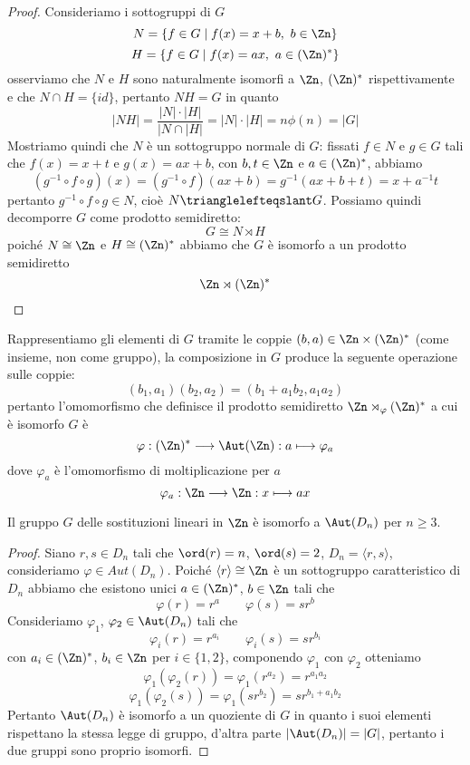 \documentclass[11pt]{scrartcl}
\begin{document}
\begin{proof}
    Consideriamo i sottogruppi di $G$
    \[
        N = \{f \in G\mid f(x) = x + b,~b \in \Zn\}
    \]
    \[
        H = \{f \in G\mid f(x) = ax,~a \in (\Zn)^*\}
    \]
    osserviamo che $N$ e $H$ sono naturalmente isomorfi a $\Zn$, $(\Zn)^*$ 
    rispettivamente e che $N \cap H = \{id\}$, pertanto $NH = G$ in quanto 
    \[
        |NH| = \frac{|N|\cdot|H|}{|N\cap|H|} = |N|\cdot|H| = n\phi(n) = |G|
    \]
    Mostriamo quindi che $N$ è un sottogruppo normale di $G$: fissati $f \in N$
    e $g \in G$ tali che $f(x) = x + t$ e $g(x) = ax + b$, con $b, t \in \Zn$ e 
    $a \in (\Zn)^*$, abbiamo
    \[
        (g^{-1}\circ f \circ g)(x) = (g^{-1}\circ f)(ax + b) = g^{-1}(ax + b + t) = 
        x + a^{-1}t
    \]
        pertanto $g^{-1}\circ f\circ g \in N$, cioè $N\trianglelefteqslant G$.
    Possiamo quindi decomporre $G$ come prodotto semidiretto:
    \[
        G \cong N\rtimes H
    \]
    poiché $N \cong \Zn$ e $H \cong (\Zn)^*$ abbiamo che $G$ è isomorfo a un
    prodotto semidiretto 
    \[
        \Zn \rtimes (\Zn)^*
    \]
\end{proof}

Rappresentiamo gli elementi di $G$ tramite le coppie $(b, a) \in \Zn\times (\Zn)^*$
(come insieme, non come gruppo),
la composizione in $G$ produce la seguente operazione sulle coppie:
\[
    (b_1, a_1)(b_2, a_2) = (b_1 + a_1b_2, a_1a_2)
\]
pertanto l'omomorfismo che definisce il prodotto semidiretto $\Zn \rtimes_{\varphi}(\Zn)^*$
a cui è isomorfo $G$ è 
\[
    \varphi: (\Zn)^* \longrightarrow \Aut(\Zn): a \longmapsto \varphi_a
\]
dove $\varphi_a$ è l'omomorfismo di moltiplicazione per $a$
\[
    \varphi_a :\Zn \longrightarrow \Zn: x \longmapsto ax
\]

\begin{proposition}
    Il gruppo $G$ delle sostituzioni lineari in $\Zn$ è isomorfo a $\Aut(D_n)$
    per $n \geq 3$.
\end{proposition}

\begin{proof}
    Siano $r, s \in D_n$ tali che $\ord(r) = n$, $\ord(s) = 2$, $D_n = \langle r, s\rangle$,
    consideriamo $\varphi \in Aut(D_n)$. Poiché $\langle r\rangle \cong \Zn$ è un 
    sottogruppo caratteristico di $D_n$ abbiamo che esistono unici $a \in (\Zn)^*$,
    $b \in \Zn$ tali che 
    \[
        \varphi(r) = r^a\qquad \varphi(s) = sr^b
    \]
    Consideriamo $\varphi_1$, $\varphi_2 \in \Aut(D_n)$ tali che
    \[
        \varphi_i(r) = r^{a_i} \qquad \varphi_i(s) = sr^{b_i}
    \]
    con $a_i \in (\Zn)^*$, $b_i \in \Zn$ per $i \in \{1, 2\}$, componendo
    $\varphi_1$ con $\varphi_2$ otteniamo
    \[
        \varphi_1(\varphi_2(r)) = \varphi_1(r^{a_2}) = r^{a_1a_2}
    \]
    \[
        \varphi_1(\varphi_2(s)) = \varphi_1(sr^{b_2}) = sr^{b_1 + a_1b_2}
    \]
    Pertanto $\Aut(D_n)$ è isomorfo a un quoziente di $G$ in quanto i suoi
    elementi rispettano la stessa legge di gruppo, d'altra parte $|\Aut(D_n)| = |G|$,
    pertanto i due gruppi sono proprio isomorfi.
\end{proof}
\end{document}
